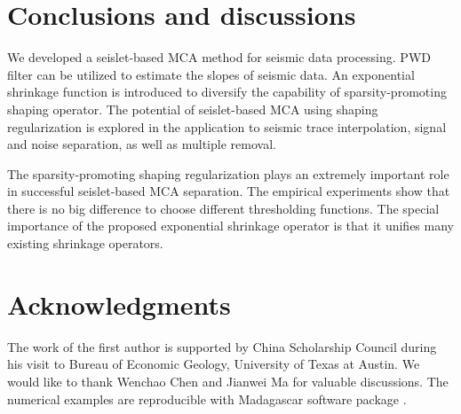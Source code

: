 

  
\section{Conclusions and discussions}

We developed a seislet-based MCA method for seismic data processing. PWD filter can be utilized to estimate the slopes of seismic data. An exponential shrinkage function is introduced to diversify the capability of sparsity-promoting shaping operator. The potential of seislet-based MCA using shaping regularization is explored in the application to seismic trace interpolation, signal and noise separation, as well as multiple removal. 

The sparsity-promoting shaping regularization plays an extremely important role in successful seislet-based MCA separation. The empirical experiments show that there is no big difference to choose different thresholding functions. The special importance of the proposed exponential shrinkage operator is that it unifies many existing shrinkage operators.


\section*{Acknowledgments}

The work of the first author is supported by China Scholarship Council during his visit to Bureau of Economic Geology, University of Texas at Austin. We would like to thank Wenchao Chen and Jianwei Ma for valuable discussions. The numerical examples are reproducible with  Madagascar software package \citep{m8r}.

